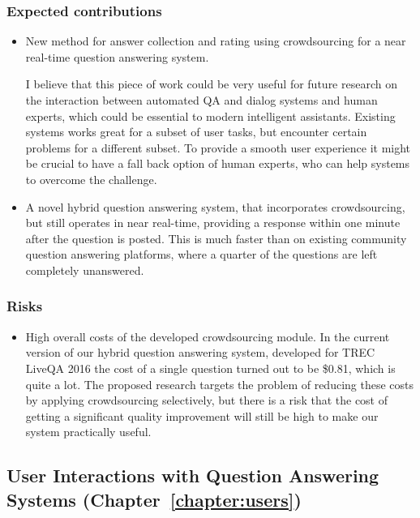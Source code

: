 \subsubsection{Expected contributions}
\label{section:proposal:plan:crowdsourcing:contributions}

\begin{itemize}
\item New method for answer collection and rating using crowdsourcing for a near real-time question answering system.

I believe that this piece of work could be very useful for future research on the interaction between automated QA and dialog systems and human experts, which could be essential to modern intelligent assistants.
Existing systems works great for a subset of user tasks, but encounter certain problems for a different subset.
To provide a smooth user experience it might be crucial to have a fall back option of human experts, who can help systems to overcome the challenge.

\item A novel hybrid question answering system, that incorporates crowdsourcing, but still operates in near real-time, \ie providing a response within one minute after the question is posted.
This is much faster than on existing community question answering platforms, where a quarter of the questions are left completely unanswered.
\end{itemize}

\subsubsection{Risks}
\label{section:proposal:plan:crowdsourcing:risks}

\begin{itemize}
\item High overall costs of the developed crowdsourcing module.
In the current version of our hybrid question answering system, developed for TREC LiveQA 2016 the cost of a single question turned out to be \$0.81, which is quite a lot.
The proposed research targets the problem of reducing these costs by applying crowdsourcing selectively, but there is a risk that the cost of getting a significant quality improvement will still be high to make our system practically useful.
\end{itemize}

\subsection{User Interactions with Question Answering Systems (Chapter~\ref{chapter:users})}
\label{section:proposal:plan:users}

